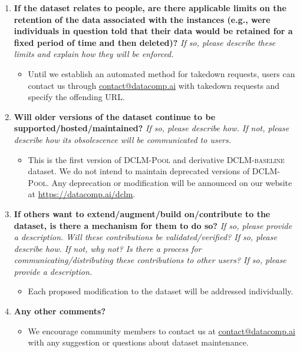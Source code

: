 \documentclass{article}
\makeatletter
\newcommand{\rawpool}{\textsc{DCLM-Pool}\xspace}
\newcommand{\hqpool}{\textsc{DCLM-baseline}\xspace}
\newcommand{\ourcode}{\url{https://datacomp.ai/dclm}\xspace}  %
\newcommand{\contactus}{\url{contact@datacomp.ai}\xspace}
\makeatother
\begin{document}
\begin{enumerate}[label=Q\arabic*, resume]
\item \textbf{If the dataset relates to people, are there applicable limits on the retention of the data associated with the instances (e.g., were individuals in question told that their data would be retained for a fixed period of time and then deleted)?} \textit{If so, please describe these limits and explain how they will be enforced.}


\begin{itemize}
\item Until we establish an automated method for takedown requests, users can contact us through \contactus with takedown requests and specify the offending URL.
\end{itemize}

\item \textbf{Will older versions of the dataset continue to be supported/hosted/maintained?} \textit{If so, please describe how. If not, please describe how its obsolescence will be communicated to users.}

\begin{itemize}
\item This is the first version of \rawpool and derivative \hqpool dataset. We do not intend to maintain deprecated versions of \rawpool. Any deprecation or modification will be announced on our website at \ourcode.
\end{itemize}

\item \textbf{If others want to extend/augment/build on/contribute to the dataset, is there a mechanism for them to do so?} \textit{If so, please provide a description. Will these contributions be validated/verified? If so, please describe how. If not, why not? Is there a process for communicating/distributing these contributions to other users? If so, please provide a description.}


\begin{itemize}
\item Each proposed modification to the dataset will be addressed individually.
\end{itemize}

\item \textbf{Any other comments?}


\begin{itemize}
\item We encourage community members to contact us at \contactus with any suggestion or questions about dataset maintenance.
\end{itemize}

\end{enumerate}

\clearpage
\end{document}
